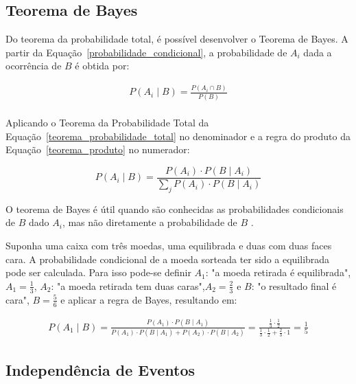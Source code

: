 \subsection{Teorema de Bayes}

Do teorema da probabilidade total, é possível desenvolver o Teorema de Bayes. A partir da Equação~\ref{probabilidade_condicional}, a probabilidade de $A_i$ dada a ocorrência de $B$ é obtida por:

\begin{align*}
	P(A_i\mid B) = \frac{P(A_i\cap B)}{P(B)}
\end{align*}
\\
Aplicando o Teorema da Probabilidade Total da Equação~\ref{teorema_probabilidade_total} no denominador e a regra do produto da Equação~\ref{teorema_produto} no numerador:



\begin{teorema}
\begin{equation}\label{Teorema_bayes}
	P(A_i\mid B) = \frac{P(A_i) \cdot P(B\mid A_i)}{\sum_{j} P(A_i) \cdot P(B\mid A_i)}
\end{equation}
\end{teorema}

O teorema de Bayes é útil quando são conhecidas as probabilidades condicionais de $B$ dado $A_i$, mas não diretamente a probabilidade de $B$ \cite{zabala_fe}.


\begin{exemplo}
	Suponha uma caixa com três moedas, uma equilibrada e duas com duas faces cara. A probabilidade condicional de a moeda sorteada ter sido a equilibrada pode ser calculada. Para isso pode-se definir $A_1$: "a moeda retirada é equilibrada", $A_1 = \frac{1}{3}$, $A_2$: "a moeda retirada tem duas caras",$A_2 = \frac{2}{3}$  e $B$: "o resultado final é cara", $B = \frac{5}{6}$ e aplicar a regra de Bayes, resultando em:

\begin{align*}
	P(A_1\mid B) = \frac{P(A_1) \cdot P(B\mid A_1)}{P(A_1) \cdot P(B\mid A_1) + P(A_2) \cdot P(B \mid A_2)} = \frac{\frac{1}{3} \cdot \frac{1}{2}}{\frac{1}{3} \cdot \frac{1}{2} + \frac{2}{3} \cdot 1} = \frac{1}{5}
\end{align*}
	
	
	
\end{exemplo}




\subsection{Independência de Eventos}


